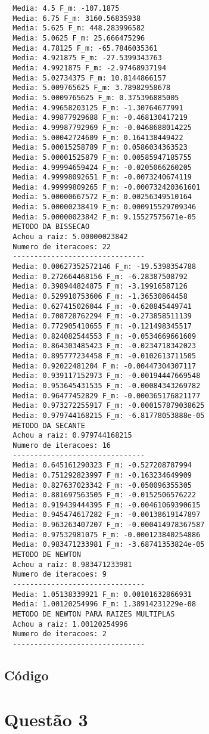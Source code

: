 \documentclass[12pt,a4paper,final]{article}
\begin{document}
\begin{lstlisting}
  Media: 4.5 F_m: -107.1875
  Media: 6.75 F_m: 3160.56835938
  Media: 5.625 F_m: 448.283996582
  Media: 5.0625 F_m: 25.666475296
  Media: 4.78125 F_m: -65.7846035361
  Media: 4.921875 F_m: -27.5399343763
  Media: 4.9921875 F_m: -2.97468937194
  Media: 5.02734375 F_m: 10.8144866157
  Media: 5.009765625 F_m: 3.78982958678
  Media: 5.0009765625 F_m: 0.375396885005
  Media: 4.99658203125 F_m: -1.30764677991
  Media: 4.99877929688 F_m: -0.468130417219
  Media: 4.99987792969 F_m: -0.0468688014225
  Media: 5.00042724609 F_m: 0.164138449422
  Media: 5.00015258789 F_m: 0.0586034363523
  Media: 5.00001525879 F_m: 0.00585947185755
  Media: 4.99994659424 F_m: -0.0205066260205
  Media: 4.99998092651 F_m: -0.0073240674119
  Media: 4.99999809265 F_m: -0.000732420361601
  Media: 5.00000667572 F_m: 0.00256349510164
  Media: 5.00000238419 F_m: 0.000915529709346
  Media: 5.00000023842 F_m: 9.15527575671e-05
  METODO DA BISSECAO
  Achou a raiz: 5.00000023842
  Numero de iteracoes: 22
  -------------------------------
  Media: 0.00627352572146 F_m: -19.5398354788
  Media: 0.272664468156 F_m: -6.28387508792
  Media: 0.398944824875 F_m: -3.19916587126
  Media: 0.529910753606 F_m: -1.36530864458
  Media: 0.627415026044 F_m: -0.620845449741
  Media: 0.708728762294 F_m: -0.273858511139
  Media: 0.772905410655 F_m: -0.121498345517
  Media: 0.824082544553 F_m: -0.0534669661609
  Media: 0.864303485423 F_m: -0.0234718342023
  Media: 0.895777234458 F_m: -0.0102613711505
  Media: 0.92022481204 F_m: -0.00447304307117
  Media: 0.939117152973 F_m: -0.00194447669548
  Media: 0.953645431535 F_m: -0.00084343269782
  Media: 0.96477452829 F_m: -0.000365176821177
  Media: 0.973272255917 F_m: -0.000157879038625
  Media: 0.979744168215 F_m: -6.81778053888e-05
  METODO DA SECANTE
  Achou a raiz: 0.979744168215
  Numero de iteracoes: 16
  -------------------------------
  Media: 0.645161290323 F_m: -0.527208787994
  Media: 0.751292823997 F_m: -0.163234649909
  Media: 0.827637023342 F_m: -0.050096355305
  Media: 0.881697563505 F_m: -0.0152506576222
  Media: 0.919439444395 F_m: -0.00461069390615
  Media: 0.945474617282 F_m: -0.00138619147897
  Media: 0.963263407207 F_m: -0.000414978367587
  Media: 0.97532981075 F_m: -0.000123840254886
  Media: 0.983471233981 F_m: -3.68741353824e-05
  METODO DE NEWTON
  Achou a raiz: 0.983471233981
  Numero de iteracoes: 9
  -------------------------------
  Media: 1.05138339921 F_m: 0.00101632866931
  Media: 1.00120254996 F_m: 1.38914231229e-08
  METODO DE NEWTON PARA RAIZES MULTIPLAS
  Achou a raiz: 1.00120254996
  Numero de iteracoes: 2
  -------------------------------
\end{lstlisting}

\subsection{Código}




\section{Questão 3}





\footnotesize{

}
\end{document}

